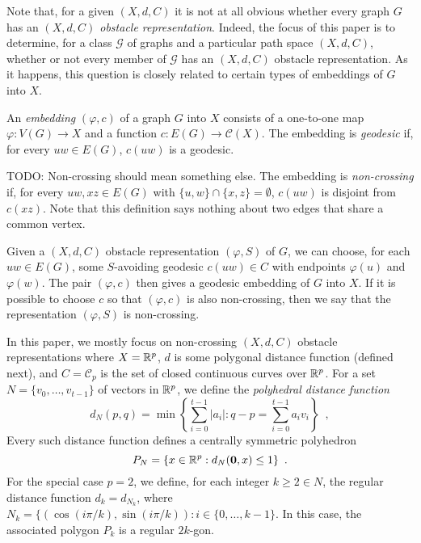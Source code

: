 \documentclass{patmorin}
\begin{document}
Note that, for a given $(X,d,C)$ it is not at all obvious whether every
graph $G$ has an \emph{$(X,d,C)$ obstacle representation}.  Indeed,
the focus of this paper is to determine, for a class $\mathcal{G}$ of
graphs and a particular path space $(X,d,C)$, whether or not every
member of $\mathcal{G}$ has an $(X,d,C)$ obstacle representation.
As it happens, this question is closely related to certain types of
embeddings of $G$ into $X$.

An \emph{embedding} $(\varphi,c)$ of a graph $G$ into $X$ consists
of a one-to-one map $\varphi:V(G)\to X$ and a function $c: E(G)\to
\mathcal{C}(X)$.  The embedding is \emph{geodesic} if, for every $uw\in
E(G)$, $c(uw)$ is a geodesic.  

TODO: Non-crossing should mean something else.
The embedding is \emph{non-crossing} if,
for every $uw,xz\in E(G)$ with $\{u,w\}\cap \{x,z\}=\emptyset$, $c(uw)$
is disjoint from $c(xz)$.  Note that this definition says nothing about
two edges that share a common vertex.

Given a $(X,d,C)$ obstacle representation $(\varphi,S)$ of $G$, we can
choose, for each $uw\in E(G)$, some $S$-avoiding geodesic $c(uw)\in C$
with endpoints $\varphi(u)$ and $\varphi(w)$.  The pair $(\varphi,c)$
then gives a geodesic embedding of $G$ into $X$.  If it is possible to
choose $c$ so that $(\varphi,c)$ is also non-crossing, then we say that
the representation $(\varphi,S)$ is non-crossing.




In this paper, we mostly focus on non-crossing $(X,d,C)$ obstacle
representations where $X=\mathbb{R}^p$, $d$ is some polygonal distance function
(defined next), and $C=\mathcal{C}_p$ is the set of closed continuous
curves over $\mathbb{R}^p$.  For a set $N=\{v_0,\ldots,v_{t-1}\}$ of vectors in
$\mathbb{R}^p$, we define the \emph{polyhedral distance function}
\[  
   d_N(p,q)=\min\left\{\sum_{i=0}^{t-1}|a_i|: 
                        q-p=\sum_{i=0}^{t-1}a_iv_i\right\} \enspace ,
\]
Every such distance function defines a centrally symmetric polyhedron
\[
   P_N=\{x\in\mathbb{R}^p: d_N(\mathbf{0},x)\le 1\}  \enspace .
\]
For the special case $p=2$, we define, for each integer $k\ge 2 \in N$,
the regular distance function $d_k=d_{N_k}$, where $N_k=\{(\cos(i\pi/k),
\sin(i\pi/k)): i\in\{0,\ldots,k-1\}$.  In this case, the associated
polygon $P_k$ is a regular $2k$-gon.
\end{document}
